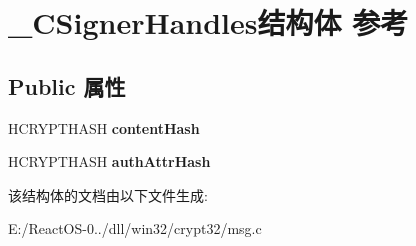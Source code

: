 \hypertarget{struct___c_signer_handles}{}\section{\+\_\+\+C\+Signer\+Handles结构体 参考}
\label{struct___c_signer_handles}
\subsection*{Public 属性}
\begin{DoxyCompactItemize}
\item 
\mbox{\label{struct___c_signer_handles_a67558d539cf46d0697f79bda69a62139}} 
H\+C\+R\+Y\+P\+T\+H\+A\+SH {\bfseries content\+Hash}
\item 
\mbox{\label{struct___c_signer_handles_a84fd705bede20ac21081ce59bc579a17}} 
H\+C\+R\+Y\+P\+T\+H\+A\+SH {\bfseries auth\+Attr\+Hash}
\end{DoxyCompactItemize}


该结构体的文档由以下文件生成\+:\begin{DoxyCompactItemize}
\item 
E\+:/\+React\+O\+S-\/0../dll/win32/crypt32/msg.\+c\end{DoxyCompactItemize}
